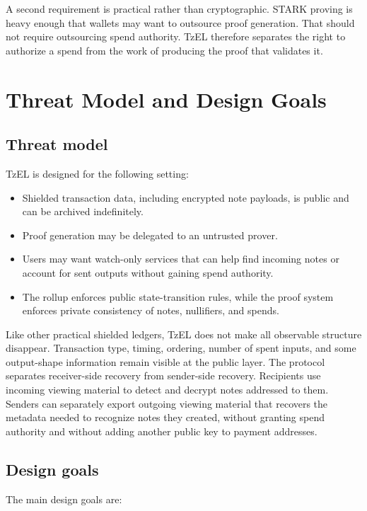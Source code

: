 \documentclass[11pt]{article}
\newcommand{\TzEL}{TzEL}
\begin{document}
A second requirement is practical rather than cryptographic. STARK proving is
heavy enough that wallets may want to outsource proof generation. That should
not require outsourcing spend authority. \TzEL{} therefore separates the right
to authorize a spend from the work of producing the proof that validates it.

\section{Threat Model and Design Goals}

\subsection{Threat model}

\TzEL{} is designed for the following setting:

\begin{itemize}
  \item Shielded transaction data, including encrypted note payloads, is public
        and can be archived indefinitely.
  \item Proof generation may be delegated to an untrusted prover.
  \item Users may want watch-only services that can help find incoming notes or
        account for sent outputs without gaining spend authority.
  \item The rollup enforces public state-transition rules, while the proof
        system enforces private consistency of notes, nullifiers, and spends.
\end{itemize}

Like other practical shielded ledgers, \TzEL{} does not make all observable
structure disappear. Transaction type, timing, ordering, number of spent
inputs, and some output-shape information remain visible at the public layer.
The protocol separates receiver-side recovery from sender-side recovery.
Recipients use incoming viewing material to detect and decrypt notes addressed
to them. Senders can separately export outgoing viewing material that recovers
the metadata needed to recognize notes they created, without granting spend
authority and without adding another public key to payment addresses.

\subsection{Design goals}

The main design goals are:
\end{document}
